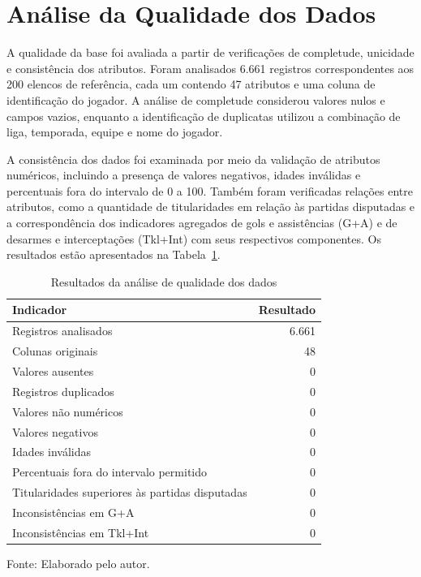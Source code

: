 \documentclass[12pt,a4paper]{article}
\begin{document}
\section{Análise da Qualidade dos Dados}

A qualidade da base foi avaliada a partir de verificações de completude, unicidade e consistência dos atributos. Foram analisados 6.661 registros correspondentes aos 200 elencos de referência, cada um contendo 47 atributos e uma coluna de identificação do jogador. A análise de completude considerou valores nulos e campos vazios, enquanto a identificação de duplicatas utilizou a combinação de liga, temporada, equipe e nome do jogador.

A consistência dos dados foi examinada por meio da validação de atributos numéricos, incluindo a presença de valores negativos, idades inválidas e percentuais fora do intervalo de 0 a 100. Também foram verificadas relações entre atributos, como a quantidade de titularidades em relação às partidas disputadas e a correspondência dos indicadores agregados de gols e assistências (G+A) e de desarmes e interceptações (Tkl+Int) com seus respectivos componentes. Os resultados estão apresentados na Tabela~\ref{tab:qualidade_dados}.

\begin{table}[htbp]
    \centering
    \caption{Resultados da análise de qualidade dos dados}
    \label{tab:qualidade_dados}
    \begin{tabular}{lr}
        \hline
        \textbf{Indicador} & \textbf{Resultado} \\
        \hline
        Registros analisados & 6.661 \\
        Colunas originais & 48 \\
        Valores ausentes & 0 \\
        Registros duplicados & 0 \\
        Valores não numéricos & 0 \\
        Valores negativos & 0 \\
        Idades inválidas & 0 \\
        Percentuais fora do intervalo permitido & 0 \\
        Titularidades superiores às partidas disputadas & 0 \\
        Inconsistências em G+A & 0 \\
        Inconsistências em Tkl+Int & 0 \\
        \hline
    \end{tabular}
    \par\smallskip
    \footnotesize Fonte: Elaborado pelo autor.
\end{table}
\end{document}
